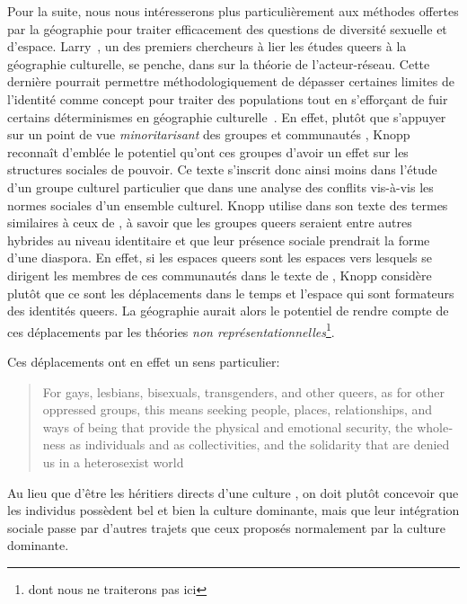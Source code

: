 Pour la suite, nous nous intéresserons plus particulièrement aux méthodes offertes par la géographie pour traiter efficacement des questions de diversité sexuelle et d'espace. 
Larry~\citet{Knopp2004}, un des premiers chercheurs à lier les études queers à la géographie culturelle, se penche, dans  sur la théorie de l'acteur-réseau. 
Cette dernière pourrait permettre méthodologiquement de dépasser certaines limites de l'identité comme concept pour traiter des populations \lgbt{} tout en s’efforçant de fuir certains déterminismes en géographie culturelle~\citep{Knopp2004}. 
En effet, plutôt que s'appuyer sur un point de vue \emph{minoritarisant} des groupes et communautés \lgbt{}, Knopp reconnaît d'emblée le potentiel qu'ont ces groupes d'avoir un effet sur les structures sociales de pouvoir. 
Ce texte s'inscrit donc ainsi moins dans l'étude d'un groupe culturel particulier que dans une analyse des conflits vis-à-vis les normes sociales d'un ensemble culturel. 
Knopp utilise dans son texte des termes similaires à ceux de \citet{Sinfield1996}, à savoir que les groupes queers seraient entre autres hybrides au niveau identitaire et que leur présence sociale prendrait la forme d'une diaspora. 
En effet, si les espaces queers sont les espaces vers lesquels se dirigent les membres de ces communautés dans le texte de \citet{Sinfield1996}, Knopp considère plutôt que ce sont les déplacements dans le temps et l'espace qui sont formateurs des identités queers.
La géographie aurait alors le potentiel de rendre compte de ces déplacements par les théories \emph{non représentationnelles}\footnote{dont nous ne traiterons pas ici}.

Ces déplacements ont en effet un sens particulier: \foreignblockquote{english}[{\cite[123]{Knopp2004}}][.]{For gays, lesbians, bisexuals, transgenders, and other queers, as for other oppressed groups, this means seeking people, places, relationships, and ways of being that provide the physical and emotional security, the wholeness as individuals and as collectivities, and the solidarity that are denied us in a heterosexist world}
Au lieu que d'être les héritiers directs d'une culture \qu{}, on doit plutôt concevoir que les individus \qus{} possèdent bel et bien la culture dominante, mais que leur intégration sociale passe par d'autres trajets que ceux proposés normalement par la culture dominante.

